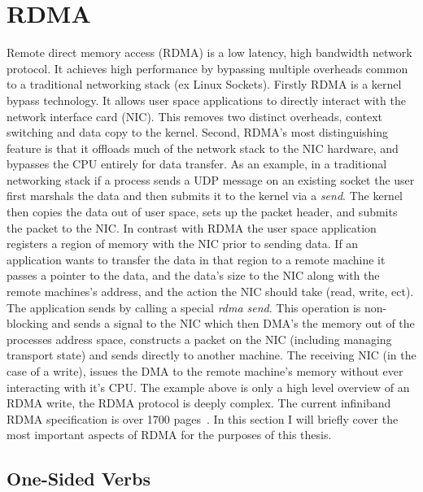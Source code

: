 \documentclass[12pt]{ucsddissertation}
\begin{document}
\section{RDMA}

Remote direct memory access (RDMA) is a low latency, high bandwidth network protocol. It achieves
high performance by bypassing multiple overheads common to a traditional networking stack (ex Linux
Sockets). Firstly RDMA is a kernel bypass technology. It allows user space applications to directly
interact with the network interface card (NIC). This removes two distinct overheads, context
switching and data copy to the kernel. Second, RDMA's most distinguishing feature is that it
offloads much of the network stack to the NIC hardware, and bypasses the CPU entirely for data
transfer. As an example, in a traditional networking stack if a process sends a UDP message on an
existing socket the user first marshals the data and then submits it to the kernel via a
\textit{send}. The kernel then copies the data out of user space, sets up the packet header, and
submits the packet to the NIC. In contrast with RDMA the user space application registers a region
of memory with the NIC prior to sending data. If an application wants to transfer the data in that
region to a remote machine it passes a pointer to the data, and the data's size to the NIC along
with the remote machines's address, and the action the NIC should take (read, write, ect). The
application sends by calling a special \textit{rdma send}. This operation is non-blocking and sends
a signal to the NIC which then DMA's the memory out of the processes address space, constructs a
packet on the NIC (including managing transport state) and sends directly to another machine. The
receiving NIC (in the case of a write), issues the DMA to the remote machine's memory without ever
interacting with it's CPU.  The example above is only a high level overview of an RDMA write, the
RDMA protocol is deeply complex. The current infiniband RDMA specification is over 1700
pages~\cite{infiniband-spec}. In this section I will briefly cover the most important aspects of
RDMA for the purposes of this thesis.

\subsection{One-Sided Verbs}
\end{document}
